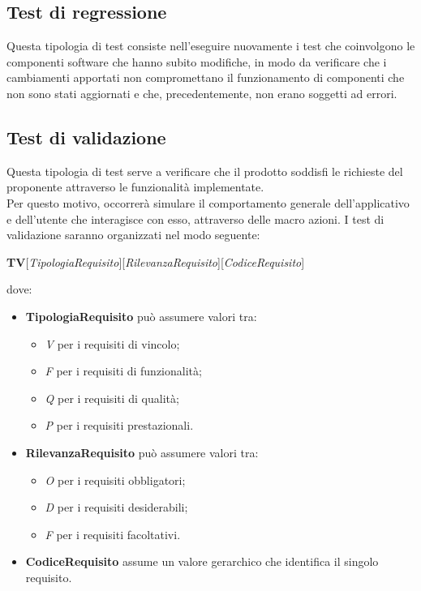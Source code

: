 	\subsection{Test di regressione}
	Questa tipologia di test consiste nell'eseguire nuovamente i test che coinvolgono le componenti software che hanno subito modifiche, in modo da verificare che i cambiamenti apportati non compromettano il funzionamento di componenti che non sono stati aggiornati e che, precedentemente, non erano soggetti ad errori.
	
	\subsection{Test di validazione}
	Questa tipologia di test serve a verificare che il prodotto soddisfi le richieste del proponente attraverso le funzionalità implementate.\\
	Per questo motivo, occorrerà simulare il comportamento generale dell'applicativo e dell'utente che interagisce con esso, attraverso delle macro azioni.
	I test di validazione saranno organizzati nel modo seguente:
	\begin{center}
		\textbf{TV}[\textit{TipologiaRequisito}][\textit{RilevanzaRequisito}][\textit{CodiceRequisito}]
	\end{center}
	dove:
	\begin{itemize}
		\item
		\textbf{TipologiaRequisito} può assumere valori tra:
		\begin{itemize}
			\item
			\textit{V} per i requisiti di vincolo;
			\item
			\textit{F} per i requisiti di funzionalità;
			\item
			\textit{Q} per i requisiti di qualità;
			\item
			\textit{P} per i requisiti prestazionali.
		\end{itemize}
		\item 
		\textbf{RilevanzaRequisito} può assumere valori tra:
		\begin{itemize}
			\item
			\textit{O} per i requisiti obbligatori;
			\item
			\textit{D} per i requisiti desiderabili;
			\item
			\textit{F} per i requisiti facoltativi.
		\end{itemize}
		\item
		\textbf{CodiceRequisito} assume un valore gerarchico che identifica il singolo requisito.
	\end{itemize}

